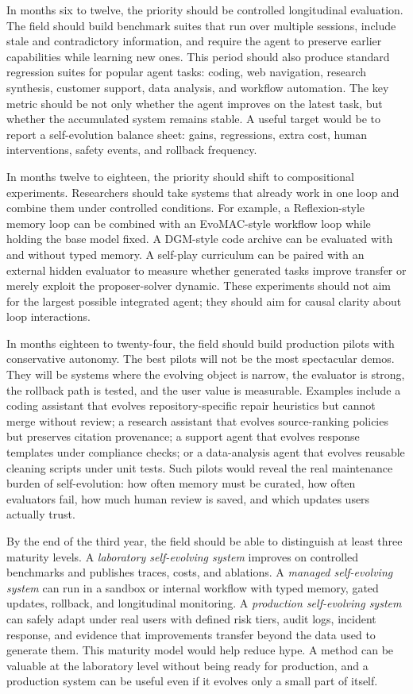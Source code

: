 In months six to twelve, the priority should be controlled longitudinal evaluation. The field should build benchmark suites that run over multiple sessions, include stale and contradictory information, and require the agent to preserve earlier capabilities while learning new ones. This period should also produce standard regression suites for popular agent tasks: coding, web navigation, research synthesis, customer support, data analysis, and workflow automation. The key metric should be not only whether the agent improves on the latest task, but whether the accumulated system remains stable. A useful target would be to report a self-evolution balance sheet: gains, regressions, extra cost, human interventions, safety events, and rollback frequency.

In months twelve to eighteen, the priority should shift to compositional experiments. Researchers should take systems that already work in one loop and combine them under controlled conditions. For example, a Reflexion-style memory loop can be combined with an EvoMAC-style workflow loop while holding the base model fixed. A DGM-style code archive can be evaluated with and without typed memory. A self-play curriculum can be paired with an external hidden evaluator to measure whether generated tasks improve transfer or merely exploit the proposer-solver dynamic. These experiments should not aim for the largest possible integrated agent; they should aim for causal clarity about loop interactions.

In months eighteen to twenty-four, the field should build production pilots with conservative autonomy. The best pilots will not be the most spectacular demos. They will be systems where the evolving object is narrow, the evaluator is strong, the rollback path is tested, and the user value is measurable. Examples include a coding assistant that evolves repository-specific repair heuristics but cannot merge without review; a research assistant that evolves source-ranking policies but preserves citation provenance; a support agent that evolves response templates under compliance checks; or a data-analysis agent that evolves reusable cleaning scripts under unit tests. Such pilots would reveal the real maintenance burden of self-evolution: how often memory must be curated, how often evaluators fail, how much human review is saved, and which updates users actually trust.

By the end of the third year, the field should be able to distinguish at least three maturity levels. A \emph{laboratory self-evolving system} improves on controlled benchmarks and publishes traces, costs, and ablations. A \emph{managed self-evolving system} can run in a sandbox or internal workflow with typed memory, gated updates, rollback, and longitudinal monitoring. A \emph{production self-evolving system} can safely adapt under real users with defined risk tiers, audit logs, incident response, and evidence that improvements transfer beyond the data used to generate them. This maturity model would help reduce hype. A method can be valuable at the laboratory level without being ready for production, and a production system can be useful even if it evolves only a small part of itself.

